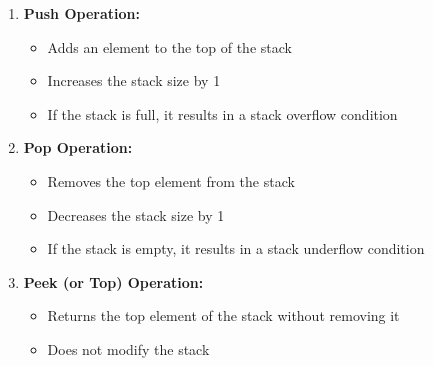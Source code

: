 \begin{enumerate}
\def\labelenumi{\arabic{enumi}.}
\tightlist
\item
  \textbf{Push Operation:}

  \begin{itemize}
  \tightlist
  \item
    Adds an element to the top of the stack
  \item
    Increases the stack size by 1
  \item
    If the stack is full, it results in a stack overflow condition
  \end{itemize}

\begin{Shaded}
\begin{Highlighting}[]
     \OperatorTok{\textless{}}
    \NormalTok{:}
        \NormalTok{(}\NormalTok{)}
\end{Highlighting}
\end{Shaded}
\item
  \textbf{Pop Operation:}

  \begin{itemize}
  \tightlist
  \item
    Removes the top element from the stack
  \item
    Decreases the stack size by 1
  \item
    If the stack is empty, it results in a stack underflow condition
  \end{itemize}

\begin{Shaded}
\begin{Highlighting}[]
     
    \NormalTok{:}
        \NormalTok{(}\NormalTok{)}
         
\end{Highlighting}
\end{Shaded}
\item
  \textbf{Peek (or Top) Operation:}

  \begin{itemize}
  \tightlist
  \item
    Returns the top element of the stack without removing it
  \item
    Does not modify the stack
  \end{itemize}


\end{enumerate}
